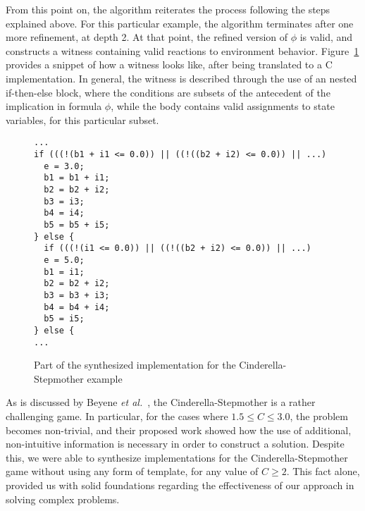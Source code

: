 From this point on, the algorithm reiterates the process following the steps
explained above. For this particular example, the algorithm terminates after one
more refinement, at depth 2. At that point, the refined version of
$\phi$ is valid, and \aeval constructs a witness containing valid reactions to
environment behavior. Figure~\ref{fg:witness} provides a snippet of how a
witness looks like, after being translated to a C implementation. In general,
the witness is described through the use of an nested if-then-else block, where the conditions are subsets of the antecedent of
the implication in formula $\phi$, while the body contains valid assignments to
state variables, for this particular subset.


\begin{figure}[!t]
\centering
 \begin{Verbatim}[fontsize=\scriptsize]
...
if (((!(b1 + i1 <= 0.0)) || ((!((b2 + i2) <= 0.0)) || ...)
  e = 3.0;
  b1 = b1 + i1;
  b2 = b2 + i2;
  b3 = i3;
  b4 = i4;
  b5 = b5 + i5;
} else {
  if (((!(i1 <= 0.0)) || ((!((b2 + i2) <= 0.0)) || ...)
  e = 5.0;
  b1 = i1;
  b2 = b2 + i2;
  b3 = b3 + i3;
  b4 = b4 + i4;
  b5 = i5;
} else {
...
 \end{Verbatim}
\caption{Part of the synthesized implementation for the Cinderella-Stepmother
example}
\label{fg:witness}
\end{figure}

As is discussed by Beyene \textit{et al.}~\cite{beyene2014constraint}, the
Cinderella-Stepmother is a rather challenging game. In particular, for the
cases where $1.5 \leq C \leq 3.0$, the problem becomes non-trivial, and their
proposed work showed how the use of additional, non-intuitive information is
necessary in order to construct a solution. Despite this, we were able to
synthesize implementations for the Cinderella-Stepmother game without using any form of template, for any value of $C \geq 2$.
This fact alone, provided us with solid foundations regarding the effectiveness of our approach in solving
complex problems.
         